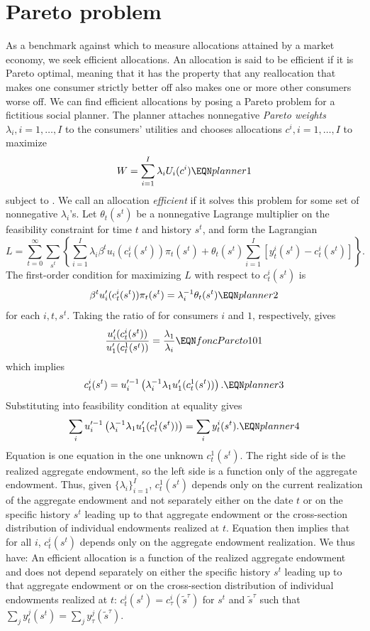 \section{Pareto problem}
As a benchmark against which to measure allocations attained by a
market  economy, we seek efficient allocations. An allocation is
said to be efficient if it is Pareto optimal, meaning that  it has the property
that any reallocation  that makes one consumer strictly better
off also makes one or more other consumers worse off. We can find
efficient allocations by posing a Pareto problem for a fictitious
social planner. The  planner attaches nonnegative {\it Pareto
weights\/} $\lambda_i, i=1, \ldots, I$ to the consumers' utilities and
chooses allocations $c^i, i=1, \ldots, I$ to maximize
$$ W = \sum_{i=1}^I \lambda_i U_i(c^i)  \EQN planner1  $$
subject to .
We call an allocation {\it efficient\/}
if it solves this problem for some set of
nonnegative $\lambda_i$'s.
Let $\theta_t(s^t)$ be a nonnegative Lagrange multiplier on the
feasibility constraint 
for time  $t$ and  history  $s^t$,  and form
the Lagrangian
$$ L =
 \sum_{t=0}^\infty \sum_{s^t}
   \left\{  \sum_{i=1}^I \lambda_i \beta^t u_i(c_t^i(s^t)) \pi_t(s^t)
     + \theta_t(s^t) \sum_{i=1}^I [ y_t^i(s^t) - c_t^i(s^t) ]  \right\} . $$
The first-order condition for maximizing $L$
with respect to $c_t^i(s^t)$ is
$$ \beta^t u'_i(c_t^i(s^t))\pi_t(s^t) = \lambda_i^{-1}  \theta_t(s^t)
\EQN planner2 $$
for each $i, t, s^t$.  Taking the ratio of  for  consumers
$i$ and $1$, respectively,
gives
$$ {u'_i(c^i_t(s^t)) \over u'_1(c^1_t(s^t))} = {\lambda_1  \over \lambda_i}  \EQN foncPareto101 $$
which implies
$$ c_t^i(s^t) = u^{\prime -1}_i
    \left(\lambda_i^{-1} \lambda_1 u'_1(c_t^1(s^t)) \right). \EQN planner3
$$
Substituting  into feasibility condition  at
equality gives
$$ \sum_i u^{\prime -1}_i
    \left(\lambda_i^{-1} \lambda_1 u'_1(c_t^1(s^t)) \right)
  = \sum_i y_t^i(s^t)  . \EQN planner4 $$
Equation  is one equation in the one unknown  $c_t^1(s^t)$. The right
side of  is the realized aggregate endowment, so the
left side is  a function only of the aggregate endowment. Thus, given $\{\lambda_i\}_{i=1}^I$,
$c_t^1(s^t)$ depends only on the current realization of the
aggregate endowment and not separately  either on  the date $t$ or on the specific history $s^t$
leading up to that aggregate endowment or  the cross-section distribution of individual
endowments realized at $t$. Equation  then implies that for all $i$,
$c_t^i(s^t)$ depends only on the aggregate endowment realization.
We thus have:
\medskip
{} An efficient allocation is a function of
the realized aggregate endowment and  does not depend separately  on either the specific history $s^t$
leading up to that aggregate endowment or on the cross-section distribution of individual
endowments realized at $t$: $c_t^i(s^t)=c_\tau^i(\tilde
s^{\tau})$ for $s^t$ and $\tilde s^{\tau}$ such that $\sum_j
y_t^j(s^t) = \sum_j y_\tau^j(\tilde s^{\tau})$.
\medskip

